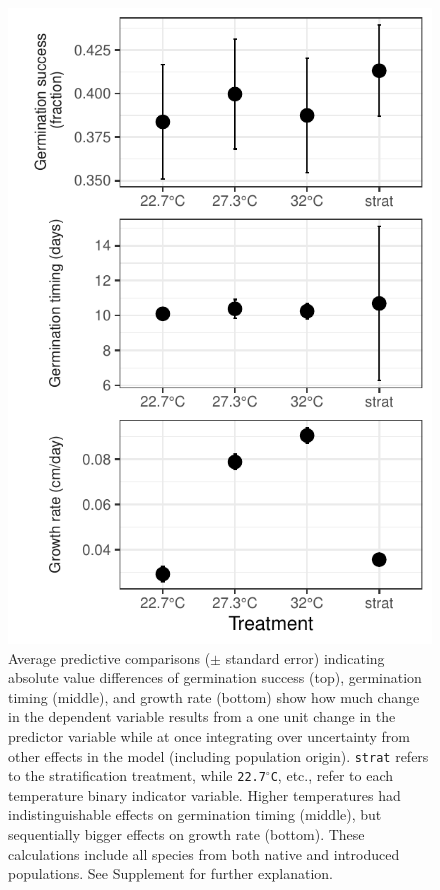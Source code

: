 \documentclass[11pt]{article}\usepackage[]{graphicx}\usepackage[]{color}
\begin{document}
\begin{figure}[ht!]
	\centering
	\includegraphics[width=.5\textwidth]{apc_fig.pdf}
	\caption{Average predictive comparisons ($\pm$ standard error) indicating absolute value differences of germination success (top), germination timing (middle), and growth rate (bottom) show how much change in the dependent variable results from a one unit change in the predictor variable while at once integrating over uncertainty from other effects in the model (including population origin). \texttt{strat} refers to the stratification treatment, while \texttt{22.7$^{\circ}$C}, etc., refer to each temperature binary indicator variable. Higher temperatures had indistinguishable effects on germination timing (middle), but sequentially bigger effects on growth rate (bottom). These calculations include all species from both native and introduced populations. See Supplement for further explanation.}
	\label{fig:apc}
\end{figure}
\end{document}
